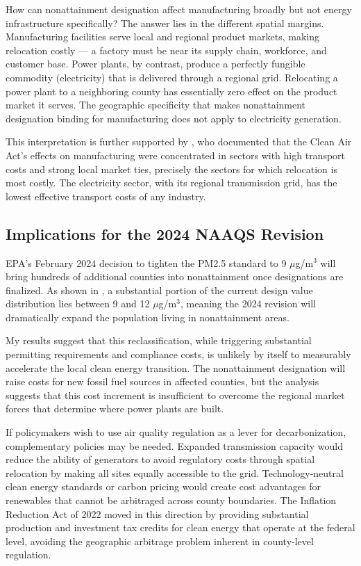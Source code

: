 \documentclass[12pt]{article}
\begin{document}
How can nonattainment designation affect manufacturing broadly but not energy infrastructure specifically? The answer lies in the different spatial margins. Manufacturing facilities serve local and regional product markets, making relocation costly --- a factory must be near its supply chain, workforce, and customer base. Power plants, by contrast, produce a perfectly fungible commodity (electricity) that is delivered through a regional grid. Relocating a power plant to a neighboring county has essentially zero effect on the product market it serves. The geographic specificity that makes nonattainment designation binding for manufacturing does not apply to electricity generation.

This interpretation is further supported by \citet{becker2000effects}, who documented that the Clean Air Act's effects on manufacturing were concentrated in sectors with high transport costs and strong local market ties, precisely the sectors for which relocation is most costly. The electricity sector, with its regional transmission grid, has the lowest effective transport costs of any industry.

\subsection{Implications for the 2024 NAAQS Revision}

EPA's February 2024 decision to tighten the PM2.5 standard to 9 $\mu$g/m$^3$ will bring hundreds of additional counties into nonattainment once designations are finalized. As shown in , a substantial portion of the current design value distribution lies between 9 and 12 $\mu$g/m$^3$, meaning the 2024 revision will dramatically expand the population living in nonattainment areas.

My results suggest that this reclassification, while triggering substantial permitting requirements and compliance costs, is unlikely by itself to measurably accelerate the local clean energy transition. The nonattainment designation will raise costs for new fossil fuel sources in affected counties, but the analysis suggests that this cost increment is insufficient to overcome the regional market forces that determine where power plants are built.

If policymakers wish to use air quality regulation as a lever for decarbonization, complementary policies may be needed. Expanded transmission capacity would reduce the ability of generators to avoid regulatory costs through spatial relocation by making all sites equally accessible to the grid. Technology-neutral clean energy standards or carbon pricing would create cost advantages for renewables that cannot be arbitraged across county boundaries. The Inflation Reduction Act of 2022 moved in this direction by providing substantial production and investment tax credits for clean energy that operate at the federal level, avoiding the geographic arbitrage problem inherent in county-level regulation.
\end{document}
